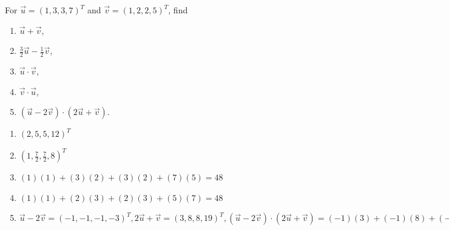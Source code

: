 \begin{Exercise}
For $\vec{u} = (1, 3, 3, 7)^T$ and $\vec{v} = (1, 2, 2, 5)^T$, find
\begin{enumerate}[label=(\alph*)]
\item $\vec{u} + \vec{v}$,
\item $\frac{3}{2}\vec{u} - \frac{1}{2}\vec{v}$,
\item $\vec{u} \cdot \vec{v}$,
\item $\vec{v} \cdot \vec{u}$,
\item $(\vec{u} - 2\vec{v}) \cdot (2\vec{u} + \vec{v})$.
\end{enumerate}
\end{Exercise}
\begin{Answer}
\begin{enumerate}[label=(\alph*)]
\item $(2, 5, 5, 12)^T$ 
\item $(1, \frac{7}{2}, \frac{7}{2}, 8)^T$
\item $(1)(1) + (3)(2) + (3)(2) + (7)(5) = 48$
\item $(1)(1) + (2)(3) + (2)(3) + (5)(7) = 48$
\item $\vec{u}-2\vec{v} = (-1, -1, -1, -3)^T, 2\vec{u} + \vec{v} = (3, 8, 8, 19)^T, (\vec{u} - 2\vec{v}) \cdot (2\vec{u} + \vec{v}) = (-1)(3) + (-1)(8) + (-1)(8) + (-3)(19) = -76$ 
\end{enumerate}
\end{Answer}

